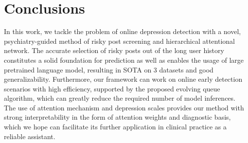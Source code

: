 \section{Conclusions}

In this work, we tackle the problem of online depression detection with a novel, psychiatry-guided method of risky post screening and hierarchical attentional network. The accurate selection of risky posts out of the long user history constitutes a solid foundation for prediction as well as enables the usage of large pretrained language model, resulting in SOTA on 3 datasets and good generalizability. Furthermore, our framework can work on online early detection scenarios with high efficiency, supported by the proposed evolving queue algorithm, which can greatly reduce the required number of model inferences. The use of attention mechanism and depression scales provides our method with strong interpretability in the form of attention weights and diagnostic basis, which we hope can facilitate its further application in clinical practice as a reliable assistant. 
